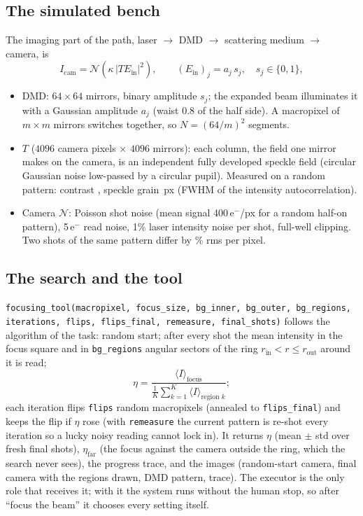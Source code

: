\documentclass[11pt,a4paper]{article}
\begin{document}
\subsection*{The simulated bench}
The imaging part of the path, laser $\to$ DMD $\to$ scattering medium $\to$ camera, is
\[
I_\text{cam}=\mathcal N\!\left(\kappa\,\big|T E_\text{in}\big|^2\right),\qquad (E_\text{in})_j=a_j\,s_j,\quad s_j\in\{0,1\},
\]
\begin{itemize}[leftmargin=*,itemsep=1pt]
\item DMD: $64\times64$ mirrors, binary amplitude $s_j$; the expanded beam illuminates it with a Gaussian amplitude $a_j$ (waist
0.8 of the half side). A macropixel of $m\times m$ mirrors switches together, so $N=(64/m)^2$ segments.
\item $T$ ($4096$ camera pixels $\times$ $4096$ mirrors): each column, the field one mirror makes on the camera, is an independent
fully developed speckle field (circular Gaussian noise low-passed by a circular pupil). Measured on a random pattern: contrast
\specklecontrast, speckle grain \specklegrain\,px (FWHM of the intensity autocorrelation).
\item Camera $\mathcal N$: Poisson shot noise (mean signal 400\,e$^-$/px for a random half-on pattern), 5\,e$^-$ read noise, 1\%
laser intensity noise per shot, full-well clipping. Two shots of the same pattern differ by \shotnoise\% rms per pixel.
\end{itemize}

\subsection*{The search and the tool}
\texttt{focusing\_tool(macropixel, focus\_size, bg\_inner, bg\_outer, bg\_regions, iterations, flips, flips\_final, remeasure,
final\_shots)} follows the algorithm of the task: random start; after every shot the mean intensity in the focus square and in
\texttt{bg\_regions} angular sectors of the ring $r_\text{in}<r\le r_\text{out}$ around it is read;
\[
\eta=\frac{\langle I\rangle_\text{focus}}{\frac1K\sum_{k=1}^{K}\langle I\rangle_{\text{region }k}};
\]
each iteration flips \texttt{flips} random macropixels (annealed to \texttt{flips\_final}) and keeps the flip if $\eta$ rose
(with \texttt{remeasure} the current pattern is re-shot every iteration so a lucky noisy reading cannot lock in). It returns
$\eta$ (mean $\pm$ std over fresh final shots), $\eta_\text{far}$ (the focus against the camera outside the ring, which the search
never sees), the progress trace, and the images (random-start camera, final camera with the regions drawn, DMD pattern, trace).
The executor is the only role that receives it; with it the system runs without the human stop, so after ``focus the beam'' it
chooses every setting itself.
\end{document}
